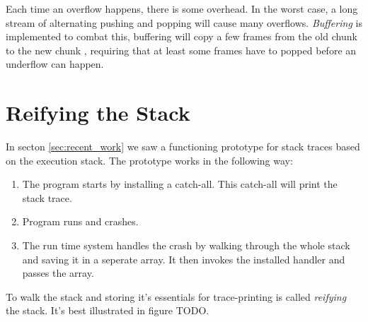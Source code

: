 Each time an overflow happens, there is some overhead. In the worst
case, a long stream of alternating pushing and popping will cause many
overflows. \emph{Buffering} is implemented to combat this, buffering
will copy a few frames from the old chunk to the new chunk %
, requiring
that at least some frames have to popped before an underflow can happen.

\section{Reifying the Stack}

In secton \ref{sec:recent_work} we saw a functioning prototype for
stack traces based on the execution stack. The prototype works in the
following way:

\begin{enumerate}
  \item
    The program starts by installing a catch-all. This catch-all will
    print the stack trace.
  \item
    Program runs and crashes.
  \item
    The run time system handles the crash by walking through the whole
    stack and saving it in a seperate array. It then invokes the
    installed handler and passes the array.
\end{enumerate}

To walk the stack and storing it's essentials for trace-printing is
called \emph{reifying} the stack. It's best illustrated in figure TODO.



